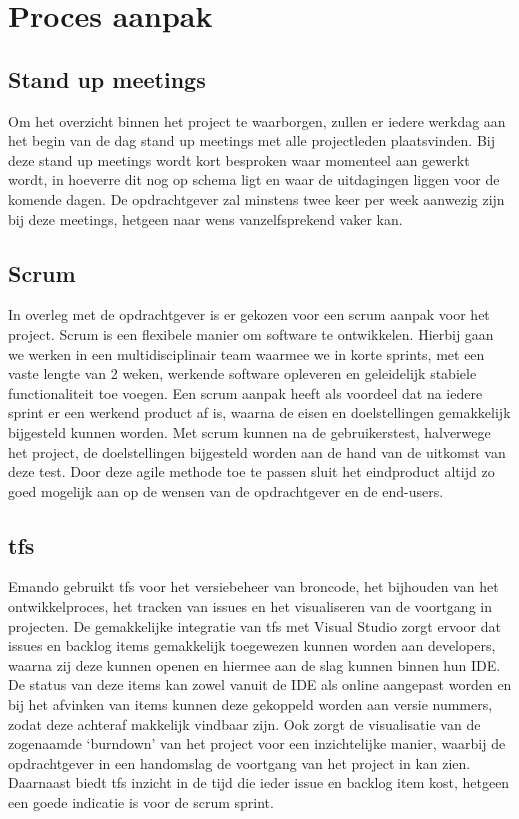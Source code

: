 \section{Proces aanpak}

\subsection{Stand up meetings}
Om het overzicht binnen het project te waarborgen, zullen er iedere werkdag aan het begin van de dag stand up meetings met alle projectleden plaatsvinden. Bij deze stand up meetings wordt kort besproken waar momenteel aan gewerkt wordt, in hoeverre dit nog op schema ligt en waar de uitdagingen liggen voor de komende dagen. De opdrachtgever zal minstens twee keer per week aanwezig zijn bij deze meetings, hetgeen naar wens vanzelfsprekend vaker kan.

\subsection{Scrum}
In overleg met de opdrachtgever is er gekozen voor een scrum aanpak voor het project. Scrum is een flexibele manier om software te ontwikkelen. Hierbij gaan we werken in een multidisciplinair team waarmee we in korte sprints, met een vaste lengte van 2 weken, werkende software opleveren en geleidelijk stabiele functionaliteit toe voegen. Een scrum aanpak heeft als voordeel dat na iedere sprint er een werkend product af is, waarna de eisen en doelstellingen gemakkelijk bijgesteld kunnen worden. Met scrum kunnen na de gebruikerstest, halverwege het project, de doelstellingen bijgesteld worden aan de hand van de uitkomst van deze test. Door deze agile methode toe te passen sluit het eindproduct altijd zo goed mogelijk aan op de wensen van de opdrachtgever en de end-users.

\subsection{\acl{tfs}}
Emando gebruikt \ac{tfs} voor het versiebeheer van broncode, het bijhouden van het ontwikkelproces, het tracken van issues en het visualiseren van de voortgang in projecten. De gemakkelijke integratie van \ac{tfs} met Visual Studio zorgt ervoor dat issues en backlog items gemakkelijk toegewezen kunnen worden aan developers, waarna zij deze kunnen openen en hiermee aan de slag kunnen binnen hun IDE. De status van deze items kan zowel vanuit de IDE als online aangepast worden en bij het afvinken van items kunnen deze gekoppeld worden aan versie nummers, zodat deze achteraf makkelijk vindbaar zijn.
Ook zorgt de visualisatie van de zogenaamde ‘burndown’ van het project voor een inzichtelijke manier, waarbij de opdrachtgever in een handomslag de voortgang van het project in kan zien. Daarnaast biedt \ac{tfs} inzicht in de tijd die ieder issue en backlog item kost, hetgeen een goede indicatie is voor de scrum sprint.

